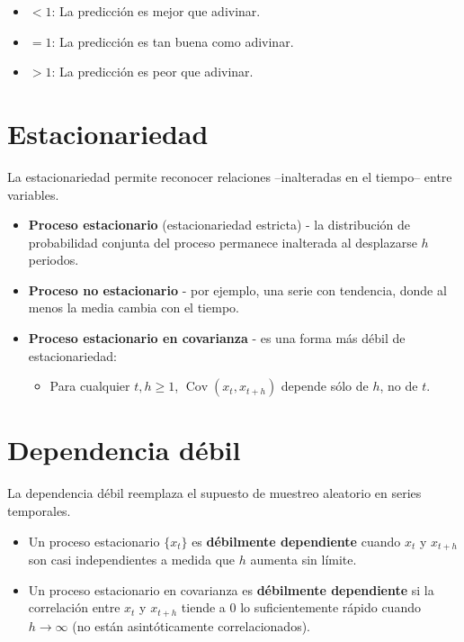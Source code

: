 \documentclass[10pt, a4paper, landscape]{article}
\DeclareMathOperator{\E}{E}
\DeclareMathOperator{\Var}{Var}
\DeclareMathOperator{\Cov}{Cov}
\begin{document}
\begin{multicols}{3}
\begin{itemize}[leftmargin=*]
	\item \( < 1 \): La predicción es mejor que adivinar.
	\item \( = 1 \): La predicción es tan buena como adivinar.
	\item \( > 1 \): La predicción es peor que adivinar.
\end{itemize}

\columnbreak

\section*{Estacionariedad}

La estacionariedad permite reconocer relaciones --inalteradas en el tiempo-- entre variables.

\begin{itemize}[leftmargin=*]
	\item \textbf{Proceso estacionario} (estacionariedad estricta) - la distribución de probabilidad conjunta del proceso permanece inalterada al desplazarse \( h \) periodos.
	\item \textbf{Proceso no estacionario} - por ejemplo, una serie con tendencia, donde al menos la media cambia con el tiempo.
	\item \textbf{Proceso estacionario en covarianza} - es una forma más débil de estacionariedad:
	\begin{itemize}[leftmargin=*]
		\item Para cualquier \( t, h \geq 1 \), \( \Cov(x_{t}, x_{t + h}) \) depende sólo de \( h \), no de \( t \).
	\end{itemize}
\end{itemize}

\section*{Dependencia débil}

La dependencia débil reemplaza el supuesto de muestreo aleatorio en series temporales.

\begin{itemize}[leftmargin=*]
	\item Un proceso estacionario \( \{ x_{t} \} \) es \textbf{débilmente dependiente} cuando \( x_{t} \) y \( x_{t + h} \) son casi independientes a medida que \( h \) aumenta sin límite.
	\item Un proceso estacionario en covarianza es \textbf{débilmente dependiente} si la correlación entre \( x_{t} \) y \( x_{t + h} \) tiende a 0 lo suficientemente rápido cuando \( h \rightarrow \infty \) (no están asintóticamente correlacionados).
\end{itemize}


\end{multicols}
\end{document}
